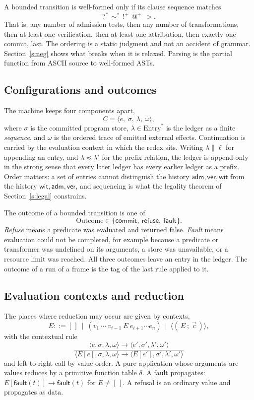 \documentclass[11pt]{article}
\newcommand{\cfg}[1]{\langle #1\rangle}
\newcommand{\step}{\longrightarrow}
\newcommand{\faultval}{\mathsf{fault}}
\newcommand{\app}{\mathbin{\|}}
\newcommand{\pre}{\preceq}
\begin{document}
A bounded transition is well-formed only if its clause sequence matches
\[
{?}^{\ast}\ \ {\sim}^{\ast}\ \ {!}^{+}\ \ {@}^{+}\ \ {>}.
\]
That is: any number of admission tests, then any number of transformations, then at least one verification, then at least one attribution, then exactly one commit, last. The ordering is a static judgment and not an accident of grammar. Section~\ref{s:neg} shows what breaks when it is relaxed. Parsing is the partial function from ASCII source to well-formed ASTs.

\subsection{Configurations and outcomes}

The machine keeps four components apart,
\[
C=\cfg{e,\ \sigma,\ \lambda,\ \omega},
\]
where $\sigma$ is the committed program store, $\lambda\in\mathrm{Entry}^{\ast}$ is the ledger as a finite \emph{sequence}, and $\omega$ is the ordered trace of emitted external effects. Continuation is carried by the evaluation context in which the redex sits. Writing $\lambda\app\ell$ for appending an entry, and $\lambda\pre\lambda'$ for the prefix relation, the ledger is append-only in the strong sense that every later ledger has every earlier ledger as a prefix. Order matters: a set of entries cannot distinguish the history $\mathsf{adm},\mathsf{ver},\mathsf{wit}$ from the history $\mathsf{wit},\mathsf{adm},\mathsf{ver}$, and sequencing is what the legality theorem of Section~\ref{s:legal} constrains.

The outcome of a bounded transition is one of
\[
\mathrm{Outcome}\in\{\mathsf{commit},\ \mathsf{refuse},\ \mathsf{fault}\}.
\]
\emph{Refuse} means a predicate was evaluated and returned false. \emph{Fault} means evaluation could not be completed, for example because a predicate or transformer was undefined on its arguments, a store was unavailable, or a resource limit was reached. All three outcomes leave an entry in the ledger. The outcome of a run of a frame is the tag of the last rule applied to it.

\subsection{Evaluation contexts and reduction}

The places where reduction may occur are given by contexts,
\[
E ::= [\,]\ \mid\ (v_1\ \cdots\ v_{i-1}\ E\ e_{i+1}\cdots e_n)\ \mid\ \langle\!(\,E\ ;\ \vec c\,)\!\rangle,
\]
with the contextual rule
\[
\dfrac{\cfg{e,\sigma,\lambda,\omega}\step\cfg{e',\sigma',\lambda',\omega'}}
      {\cfg{E[e],\sigma,\lambda,\omega}\step\cfg{E[e'],\sigma',\lambda',\omega'}}
\]
and left-to-right call-by-value order. A pure application whose arguments are values reduces by a primitive function table $\delta$. A fault propagates: $E[\faultval(t)]\step\faultval(t)$ for $E\neq[\,]$. A refusal is an ordinary value and propagates as data.
\end{document}
